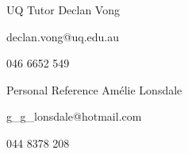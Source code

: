 


\begin{cventries}


\cventry
{UQ Tutor} %
{Declan Vong} %
{} %
{} %
{ %
\begin{cvitems}
\item declan.vong@uq.edu.au
\item 046 6652 549
\end{cvitems}
}


\cventry
{Personal Reference} %
{Amélie Lonsdale} %
{} %
{} %
{ %
\begin{cvitems}
\item g\_g\_lonsdale@hotmail.com
\item 044 8378 208
\end{cvitems}
}


\end{cventries}